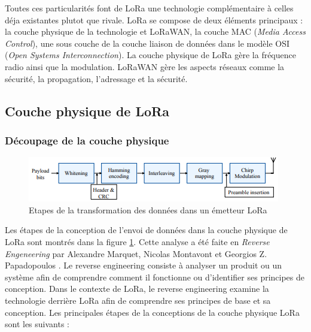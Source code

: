 \vspace{0.1cm}

Toutes ces  particularités font de LoRa une technologie complémentaire à celles déja existantes plutot que rivale.
LoRa se compose de deux éléments principaux : la couche physique de la technologie et LoRaWAN, la couche MAC (\textit{Media Access Control}), une sous couche de la couche liaison de données dans le modèle OSI (\textit{Open Systems Interconnection}). La couche physique de LoRa gère la fréquence radio ainsi que la modulation. LoRaWAN gère les aspects réseaux comme la sécurité, la propagation, l'adressage et la sécurité.

\subsection{Couche physique de LoRa}

\subsubsection{Découpage de la couche physique}

\begin{figure}[h]
\centering

\includegraphics[scale=1]{images/physical_lora_rx.PNG}
\caption{Etapes de la transformation des données dans un émetteur LoRa\cite{loraphy}}\label{term4}
\end{figure}


Les étapes de la conception de l'envoi de données dans la couche physique de LoRa sont montrés dans la figure \ref{term4}. Cette analyse a été faite en \textit{Reverse Engeneering} par Alexandre Marquet, Nicolas Montavont et Georgios Z. Papadopoulos \cite{lorareverse}. Le reverse engineering consiste à analyser un produit ou un système afin de comprendre comment il fonctionne ou d'identifier ses principes de conception. Dans le contexte de LoRa, le reverse engineering examine la technologie derrière LoRa afin de comprendre ses principes de base et sa conception. Les principales étapes de la conceptions de la couche physique LoRa sont les suivants :

\vspace{0.1cm}

